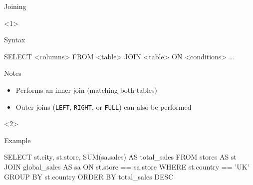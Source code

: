 \begin{frame}[t,fragile]{Joining}
    \begin{onlyenv}<1>
        \begin{block}{Syntax}
            \begin{sql}
                SELECT <columns>
                FROM <table>
                JOIN <table> ON <conditions>
                ...
            \end{sql}
        \end{block}
        \vfill
        \begin{block}{Notes}
            \begin{itemize}
                \item Performs an \alert{inner join} (matching \alert{both}
                      tables)
                \item \alert{Outer joins} (\texttt{LEFT},
                      \texttt{RIGHT}, or \texttt{FULL}) can
                      also be performed
            \end{itemize}
        \end{block}
    \end{onlyenv}
    \begin{onlyenv}<2>
        \begin{block}{Example}
            \begin{sql}
                SELECT st.city, st.store, SUM(sa.sales) AS total_sales
                FROM stores AS st
                JOIN global_sales AS sa ON st.store == sa.store
                WHERE st.country == 'UK'
                GROUP BY st.country
                ORDER BY total_sales DESC
            \end{sql}
        \end{block}
    \end{onlyenv}
\end{frame}



